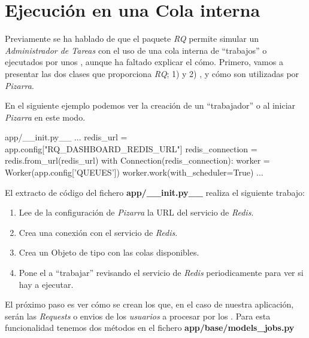 \documentclass[11pt,spanish,listoffigures,listoftables]{tfgetsinf}
\begin{document}
\FloatBarrier

\section{Ejecución en una Cola interna}

Previamente se ha hablado de que el \gls{paquete} \textit{RQ} permite simular un \textit{Administrador de Tareas} con el uso de una \gls{cola} interna de ``trabajos'' o  ejecutados por unos , aunque ha faltado explicar el cómo. Primero, vamos a presentar las dos clases que proporciona \textit{RQ}; 1)  y 2) , y cómo son utilizadas por \textit{Pizarra}.

En el siguiente ejemplo podemos ver la creación de un ``trabajador'' o  al iniciar \textit{Pizarra} en este modo. \newline

\begin{code}{app/\_\_init.py\_\_}
...
redis_url = app.config["RQ_DASHBOARD_REDIS_URL"]
redis_connection = redis.from_url(redis_url)
with Connection(redis_connection):
	worker = Worker(app.config['QUEUES'])
	worker.work(with_scheduler=True)
...
\end{code}

El extracto de código del fichero \textbf{app/\_\_init.py\_\_} realiza el siguiente trabajo:

\begin{enumerate}
	\item Lee de la configuración de \textit{Pizarra} la URL del servicio de \textit{Redis}.
	\item Crea una conexión con el servicio de \textit{Redis}.
	\item Crea un Objeto de tipo  con las \gls{cola}s disponibles.
	\item Pone el  a ``trabajar'' revisando el servicio de \textit{Redis} periodicamente para ver si hay  a ejecutar.
\end{enumerate}

El próximo paso es ver cómo se crean los  que, en el caso de nuestra aplicación, serán las \textit{Requests} o \gls{envio}s de los \textit{usuarios} a procesar por los . Para esta funcionalidad tenemos dos métodos en el fichero \textbf{app/base/models\_jobs.py} \newline
\end{document}
